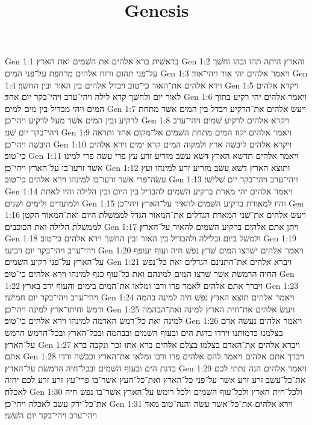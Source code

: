 

\title{Genesis}

Gen 1:1  בראשׁית ברא אלהים את השׁמים ואת הארץ׃
Gen 1:2  והארץ היתה תהו ובהו וחשׁך על־פני תהום ורוח אלהים מרחפת על־פני המים׃
Gen 1:3  ויאמר אלהים יהי אור ויהי־אור׃
Gen 1:4  וירא אלהים את־האור כי־טוב ויבדל אלהים בין האור ובין החשׁך׃
Gen 1:5  ויקרא אלהים לאור יום ולחשׁך קרא לילה ויהי־ערב ויהי־בקר יום אחד׃
Gen 1:6  ויאמר אלהים יהי רקיע בתוך המים ויהי מבדיל בין מים למים׃
Gen 1:7  ויעשׂ אלהים את־הרקיע ויבדל בין המים אשׁר מתחת לרקיע ובין המים אשׁר מעל לרקיע ויהי־כן׃
Gen 1:8  ויקרא אלהים לרקיע שׁמים ויהי־ערב ויהי־בקר יום שׁני׃
Gen 1:9  ויאמר אלהים יקוו המים מתחת השׁמים אל־מקום אחד ותראה היבשׁה ויהי־כן׃
Gen 1:10  ויקרא אלהים ליבשׁה ארץ ולמקוה המים קרא ימים וירא אלהים כי־טוב׃
Gen 1:11  ויאמר אלהים תדשׁא הארץ דשׁא עשׂב מזריע זרע עץ פרי עשׂה פרי למינו אשׁר זרעו־בו על־הארץ ויהי־כן׃
Gen 1:12  ותוצא הארץ דשׁא עשׂב מזריע זרע למינהו ועץ עשׂה־פרי אשׁר זרעו־בו למינהו וירא אלהים כי־טוב׃
Gen 1:13  ויהי־ערב ויהי־בקר יום שׁלישׁי׃
Gen 1:14  ויאמר אלהים יהי מארת ברקיע השׁמים להבדיל בין היום ובין הלילה והיו לאתת ולמועדים ולימים ושׁנים׃
Gen 1:15  והיו למאורת ברקיע השׁמים להאיר על־הארץ ויהי־כן׃
Gen 1:16  ויעשׂ אלהים את־שׁני המארת הגדלים את־המאור הגדל לממשׁלת היום ואת־המאור הקטן לממשׁלת הלילה ואת הכוכבים׃
Gen 1:17  ויתן אתם אלהים ברקיע השׁמים להאיר על־הארץ׃
Gen 1:18  ולמשׁל ביום ובלילה ולהבדיל בין האור ובין החשׁך וירא אלהים כי־טוב׃
Gen 1:19  ויהי־ערב ויהי־בקר יום רביעי׃
Gen 1:20  ויאמר אלהים ישׁרצו המים שׁרץ נפשׁ חיה ועוף יעופף על־הארץ על־פני רקיע השׁמים׃
Gen 1:21  ויברא אלהים את־התנינם הגדלים ואת כל־נפשׁ החיה הרמשׂת אשׁר שׁרצו המים למינהם ואת כל־עוף כנף למינהו וירא אלהים כי־טוב׃
Gen 1:22  ויברך אתם אלהים לאמר פרו ורבו ומלאו את־המים בימים והעוף ירב בארץ׃
Gen 1:23  ויהי־ערב ויהי־בקר יום חמישׁי׃
Gen 1:24  ויאמר אלהים תוצא הארץ נפשׁ חיה למינה בהמה ורמשׂ וחיתו־ארץ למינה ויהי־כן׃
Gen 1:25  ויעשׂ אלהים את־חית הארץ למינה ואת־הבהמה למינה ואת כל־רמשׂ האדמה למינהו וירא אלהים כי־טוב׃
Gen 1:26  ויאמר אלהים נעשׂה אדם בצלמנו כדמותנו וירדו בדגת הים ובעוף השׁמים ובבהמה ובכל־הארץ ובכל־הרמשׂ הרמשׂ על־הארץ׃
Gen 1:27  ויברא אלהים את־האדם בצלמו בצלם אלהים ברא אתו זכר ונקבה ברא אתם׃
Gen 1:28  ויברך אתם אלהים ויאמר להם אלהים פרו ורבו ומלאו את־הארץ וכבשׁה ורדו בדגת הים ובעוף השׁמים ובכל־חיה הרמשׂת על־הארץ׃
Gen 1:29  ויאמר אלהים הנה נתתי לכם את־כל־עשׂב זרע זרע אשׁר על־פני כל־הארץ ואת־כל־העץ אשׁר־בו פרי־עץ זרע זרע לכם יהיה לאכלה׃
Gen 1:30  ולכל־חית הארץ ולכל־עוף השׁמים ולכל רומשׂ על־הארץ אשׁר־בו נפשׁ חיה את־כל־ירק עשׂב לאכלה ויהי־כן׃
Gen 1:31  וירא אלהים את־כל־אשׁר עשׂה והנה־טוב מאד ויהי־ערב ויהי־בקר יום השׁשׁי׃
